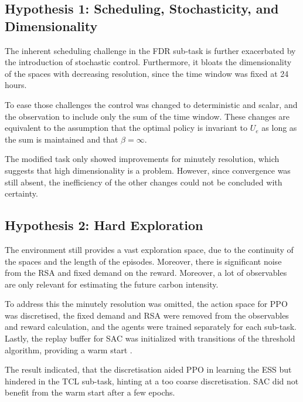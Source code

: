 \subsection{Hypothesis 1: Scheduling, Stochasticity, and Dimensionality}
The inherent scheduling challenge in the FDR sub-task is further exacerbated by the introduction of stochastic control. Furthermore, it bloats the dimensionality of the spaces with decreasing resolution, since the time window was fixed at 24 hours.
\par
To ease those challenges the control was changed to deterministic and scalar, and the observation to include only the sum of the time window. These changes are equivalent to the assumption that the optimal policy is invariant to $U_e$ as long as the sum is maintained and that $\beta = \infty$.
\par
The modified task only showed improvements for minutely resolution, which suggests that high dimensionality is a problem. However, since convergence was still absent, the inefficiency of the other changes could not be concluded with certainty.


\subsection{Hypothesis 2: Hard Exploration}
The environment still provides a vast exploration space, due to the continuity of the spaces and the length of the episodes. Moreover, there is significant noise from the RSA and fixed demand on the reward. Moreover, a lot of observables are only relevant for estimating the future carbon intensity. 
\par
To address this the minutely resolution was omitted, the action space for PPO was discretised, the fixed demand and RSA were removed from the observables and reward calculation, and the agents were trained separately for each sub-task. Lastly, the replay buffer for SAC was initialized with transitions of the threshold algorithm, providing a warm start \cite{Wang.20.06.2023}.
\par
The result indicated, that the discretisation aided PPO in learning the ESS but hindered in the TCL sub-task, hinting at a too coarse discretisation. SAC did not benefit from the warm start after a few epochs. 


